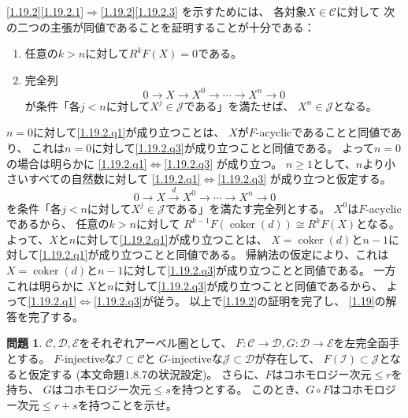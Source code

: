 \documentclass[uplatex,dvipdfmx]{jsarticle}
\makeatletter
\theoremstyle{definition}
\newtheorem{prob}[prob]{問題}
\renewenvironment{proof}[1][\proofname]{
  \pushQED{\qed}%
  \normalfont \topsep6\p@\@plus6\p@\relax
  \trivlist
  \item[\hskip\labelsep
    #1\@addpunct{\textbf{.}}]\ignorespaces
}{%
  \popQED\endtrivlist\@endpefalse
}
\providecommand{\proofname}{証明}
\DeclareMathOperator{\coker}{\mathrm{coker}}
\newcommand\mcC{\mathcal{C}}
\newcommand\mcD{\mathcal{D}}
\newcommand\mcE{\mathcal{E}}
\newcommand\mcI{\mathcal{I}}
\newcommand\mcJ{\mathcal{J}}
\makeatother
\begin{document}
\begin{proof}
  \ref{1.19.2}\ref{1.19.2.1}\(\Rightarrow\)\ref{1.19.2}\ref{1.19.2.3}
  を示すためには、
  各対象\(X\in \mcC\)に対して
  次の二つの主張が同値であることを証明することが十分である：
  \begin{enumerate}
    \item \label{1.19.2.q1}
    任意の\(k > n\)に対して\(R^kF(X) = 0\)である。
    \item \label{1.19.2.q3}
    完全列
    \[
    0 \to X \to X^0 \to \cdots \to X^n \to 0
    \]
    が条件「各\(j < n\)に対して\(X^j\in \mcJ\)である」を満たせば、
    \(X^n\in \mcJ\)となる。
  \end{enumerate}
  \(n=0\)に対して\ref{1.19.2.q1}が成り立つことは、
  \(X\)が\(F\)-acyclicであることと同値であり、
  これは\(n=0\)に対して\ref{1.19.2.q3}が成り立つことと同値である。
  よって\(n=0\)の場合は明らかに
  \ref{1.19.2.q1}\(\Leftrightarrow\)\ref{1.19.2.q3}
  が成り立つ。
  \(n\geq 1\)として、\(n\)より小さいすべての自然数に対して
  \ref{1.19.2.q1}\(\Leftrightarrow\)\ref{1.19.2.q3}
  が成り立つと仮定する。
  \[
  0 \to X \xrightarrow{d} X^0 \to \cdots \to X^n \to 0
  \]
  を条件「各\(j < n\)に対して\(X^j\in \mcJ\)である」を満たす完全列とする。
  \(X^0\)は\(F\)-acyclicであるから、
  任意の\(k > n\)に対して
  \(R^{k-1}F(\coker(d)) \cong R^kF(X)\)となる。
  よって、\(X\)と\(n\)に対して\ref{1.19.2.q1}が成り立つことは、
  \(X=\coker(d)\)と\(n-1\)に対して\ref{1.19.2.q1}が成り立つことと同値である。
  帰納法の仮定により、これは
  \(X=\coker(d)\)と\(n-1\)に対して\ref{1.19.2.q3}が成り立つことと同値である。
  一方これは明らかに
  \(X\)と\(n\)に対して\ref{1.19.2.q3}が成り立つことと同値であるから、
  よって\ref{1.19.2.q1}\(\Leftrightarrow\)\ref{1.19.2.q3}が従う。
  以上で\ref{1.19.2}の証明を完了し、
  \autoref{1.19}の解答を完了する。
\end{proof}





\begin{prob}\label{1.20}
  \(\mcC,\mcD,\mcE\)をそれぞれアーベル圏として、
  \(F:\mcC\to \mcD, G:\mcD\to \mcE\)を左完全函手とする。
  \(F\)-injectiveな\(\mcI\subset \mcC\)と
  \(G\)-injectiveな\(\mcJ\subset \mcD\)が存在して、
  \(F(\mcI)\subset \mcJ\)となると仮定する (本文命題1.8.7の状況設定)。
  さらに、\(F\)はコホモロジー次元\(\leq r\)を持ち、
  \(G\)はコホモロジー次元\(\leq s\)を持つとする。
  このとき、\(G\circ F\)はコホモロジー次元\(\leq r+s\)を持つことを示せ。
\end{prob}
\end{document}
